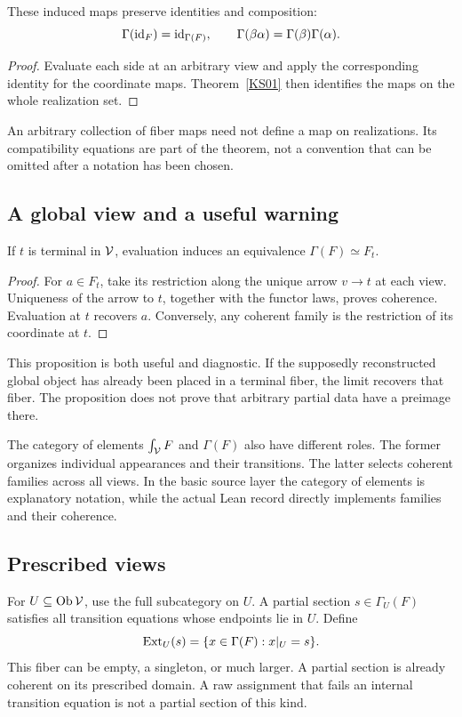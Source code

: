 \begin{proposition}\label{KS02}
These induced maps preserve identities and composition:
\[
 \Gamma(\operatorname{id}_F)=\operatorname{id}_{\Gamma(F)},\qquad
 \Gamma(\beta\alpha)=\Gamma(\beta)\Gamma(\alpha).
\]
\end{proposition}
\begin{proof}
Evaluate each side at an arbitrary view and apply the corresponding identity for the coordinate maps. Theorem~\ref{KS01} then identifies the maps on the whole realization set.
\end{proof}
An arbitrary collection of fiber maps need not define a map on realizations. Its compatibility equations are part of the theorem, not a convention that can be omitted after a notation has been chosen.

\subsection{A global view and a useful warning}
\begin{proposition}\label{KS03}
If \(t\) is terminal in \(\mathcal V\), evaluation induces an equivalence \(\Gamma(F)\simeq F_t\).
\end{proposition}
\begin{proof}
For \(a\in F_t\), take its restriction along the unique arrow \(v\to t\) at each view. Uniqueness of the arrow to \(t\), together with the functor laws, proves coherence. Evaluation at \(t\) recovers \(a\). Conversely, any coherent family is the restriction of its coordinate at \(t\).
\end{proof}
This proposition is both useful and diagnostic. If the supposedly reconstructed global object has already been placed in a terminal fiber, the limit recovers that fiber. The proposition does not prove that arbitrary partial data have a preimage there.

The category of elements \(\int_\mathcal V F\) and \(\Gamma(F)\) also have different roles. The former organizes individual appearances and their transitions. The latter selects coherent families across all views. In the basic source layer the category of elements is explanatory notation, while the actual Lean record directly implements families and their coherence.

\label{sec:glue}
\subsection{Prescribed views}
For \(U\subseteq\operatorname{Ob}\mathcal V\), use the full subcategory on \(U\). A partial section \(s\in\Gamma_U(F)\) satisfies all transition equations whose endpoints lie in \(U\). Define
\begin{equation}\label{eq:extension}
 \operatorname{Ext}_U(s)=\{x\in\Gamma(F):x|_U=s\}.
\end{equation}
This fiber can be empty, a singleton, or much larger. A partial section is already coherent on its prescribed domain. A raw assignment that fails an internal transition equation is not a partial section of this kind.

